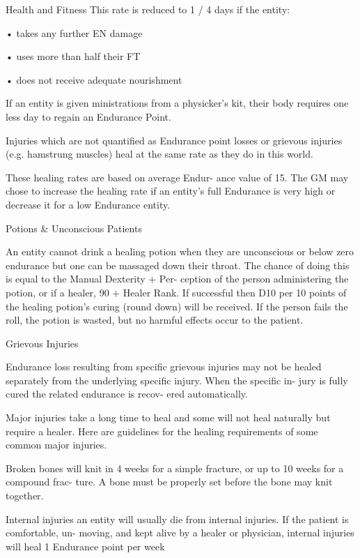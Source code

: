 \begin{Chapter}{Health and Fitness}
This rate is reduced to 1 / 4 days if the entity:  

• takes any further EN damage  

• uses more than half their FT  

• does not receive adequate nourishment 

If  an  entity 
is  given  ministrations  from  a 
physicker’s kit, their body requires one  less day to 
regain an Endurance Point. 

Injuries  which  are  not  quantified  as  Endurance 
point  losses  or  grievous  injuries  (e.g.  hamstrung 
muscles)  heal  at  the  same  rate  as  they  do  in  this 
world. 

These  healing  rates  are  based  on  average  Endur-
ance  value  of  15.  The  GM  may  chose  to  increase 
the healing rate if an entity’s full Endurance is very 
high or decrease it for a low Endurance entity. 

Potions \& Unconscious Patients 

An entity cannot drink a healing potion when they 
are  unconscious  or  below  zero  endurance  but  one 
can be massaged down their throat. The chance of 
doing  this  is  equal  to  the Manual  Dexterity  +  Per-
ception of the person administering the potion, or if 
a healer, 90 + Healer Rank. If successful then D10 
per 10 points of the healing potion’s curing (round 
down) will be received. If the person fails the roll, 
the  potion  is  wasted,  but  no  harmful  effects  occur 
to the patient. 

Grievous Injuries 

Endurance  loss  resulting  from  specific  grievous 
injuries  may  not  be  healed  separately  from  the 
underlying  specific  injury.  When  the  specific  in-
jury  is  fully  cured  the  related  endurance  is  recov-
ered automatically. 

Major  injuries  take  a  long  time  to  heal  and  some 
will  not  heal  naturally  but  require  a  healer.  Here 
are guidelines for the healing requirements of some 
common major injuries. 

Broken  bones  will  knit  in  4  weeks  for  a  simple 
fracture,  or  up  to  10  weeks  for  a  compound  frac-
ture.  A  bone  must  be  properly  set  before  the  bone 
may knit together. 

Internal  injuries  an  entity  will  usually  die  from 
internal  injuries.  If  the  patient  is  comfortable,  un-
moving,  and  kept  alive  by  a  healer  or  physician, 
internal  injuries  will  heal  1  Endurance  point  per 
week 


\end{Chapter}
